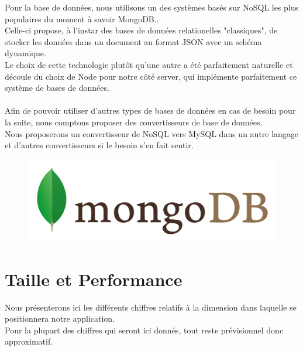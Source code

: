 \documentclass{life-fr}
\begin{document}
Pour la base de données, nous utilisons un des systèmes basés sur NoSQL les plus populaires du moment 
à savoir MongoDB..
\\
Celle-ci propose, à l'instar des bases de données relationelles "classiques", de stocker les
données dans un document au format JSON avec un schéma dynamique.
\\
Le choix de cette technologie plutôt qu'une autre a été parfaitement naturelle et découle
du choix de Node pour notre côté server, qui implémente parfaitement ce système de bases de données.
\\
\\
Afin de pouvoir utiliser d'autres types de bases de données en cas de besoin
pour la suite, nous comptons proposer des convertisseurs de base de données.\\
Nous proposerons un convertisseur de NoSQL vers MySQL dans un autre langage et
d'autres convertisseurs si le besoin s'en fait sentir.

\begin{figure}[H]
  \begin{center}
    \includegraphics[width=13cm]{img/mongodb.png}
  \end{center}
\end{figure}


\chapter{Taille et Performance}

Nous présenterons ici les différents chiffres relatifs à la dimension dans laquelle se positionnera notre application.\\
Pour la plupart des chiffres qui seront ici donnés, tout reste prévisionnel donc approximatif.\\
\end{document}

